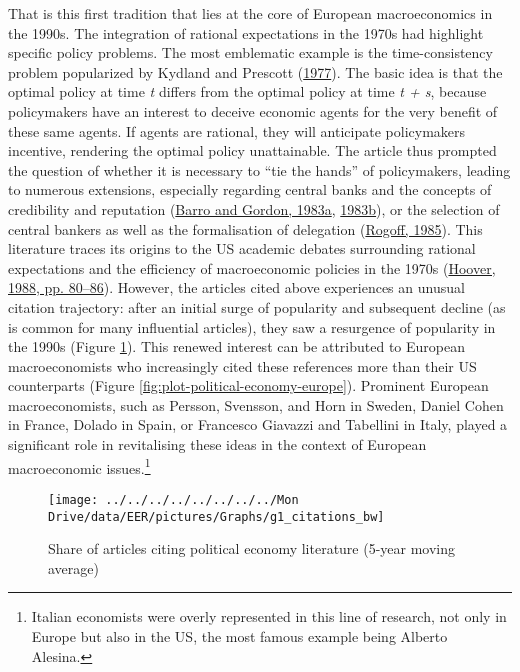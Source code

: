 \documentclass[
  12pt,
  onecolumn]{article}
\begin{document}
That is this first tradition that lies at the core of European macroeconomics in the 1990s. The integration of rational expectations in the 1970s had highlight specific policy problems. The most emblematic example is the time-consistency problem popularized by Kydland and Prescott (\protect\hyperlink{ref-kydland1977}{1977}). The basic idea is that the optimal policy at time \emph{t} differs from the optimal policy at time \emph{t + s}, because policymakers have an interest to deceive economic agents for the very benefit of these same agents. If agents are rational, they will anticipate policymakers incentive, rendering the optimal policy unattainable. The article thus prompted the question of whether it is necessary to ``tie the hands'' of policymakers, leading to numerous extensions, especially regarding central banks and the concepts of credibility and reputation (\protect\hyperlink{ref-barro1983}{Barro and Gordon, 1983a}, \protect\hyperlink{ref-barro1983c}{1983b}), or the selection of central bankers as well as the formalisation of delegation (\protect\hyperlink{ref-rogoff1985b}{Rogoff, 1985}). This literature traces its origins to the US academic debates surrounding rational expectations and the efficiency of macroeconomic policies in the 1970s (\protect\hyperlink{ref-hoover1988}{Hoover, 1988, pp. 80--86}). However, the articles cited above experiences an unusual citation trajectory: after an initial surge of popularity and subsequent decline (as is common for many influential articles), they saw a resurgence of popularity in the 1990s (Figure \ref{fig:plot-political-economy}). This renewed interest can be attributed to European macroeconomists who increasingly cited these references more than their US counterparts (Figure \ref{fig:plot-political-economy-europe}). Prominent European macroeconomists, such as Persson, Svensson, and Horn in Sweden, Daniel Cohen in France, Dolado in Spain, or Francesco Giavazzi and Tabellini in Italy, played a significant role in revitalising these ideas in the context of European macroeconomic issues.\footnote{Italian economists were overly represented in this line of research, not only in Europe but also in the US, the most famous example being Alberto Alesina.}

\begin{figure}[H]

{\centering \texttt{[image: ../../../../../../../../Mon Drive/data/EER/pictures/Graphs/g1\_citations\_bw]} 

}

\caption{Share of articles citing political economy literature (5-year moving average)}\label{fig:plot-political-economy}
\end{figure}
\end{document}
